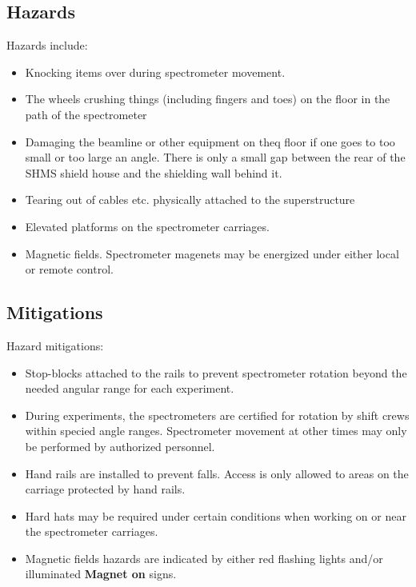 \begin{safetyen}{0}{0}
\subsection{Hazards}

Hazards include:
\begin{itemize}
\item{Knocking items over during spectrometer movement.}
\item{The wheels crushing things (including fingers and toes) on the floor in the path of the
spectrometer}
\item{Damaging the beamline or other equipment on theq floor if one goes to too small
or too large an angle.  There is
only a small gap between the rear of the SHMS shield house and the shielding wall
behind it.}
\item{Tearing out of cables etc. physically attached to the superstructure}
\item{Elevated platforms on the spectrometer carriages.}
\item{Magnetic fields.  Spectrometer magenets may be energized under either
local or remote control.}
\end{itemize}

\subsection{Mitigations}
Hazard mitigations:
\begin{itemize}
	\item{Stop-blocks attached to the rails to prevent spectrometer rotation beyond
	the needed angular range for each experiment.}
	\item{During experiments, the spectrometers are certified for rotation by
	shift crews within specied angle ranges.  Spectrometer movement at other times
	may only be performed by authorized personnel.}
	\item{Hand rails are installed to prevent falls.  Access is only allowed to
	areas on the carriage protected by hand rails.}
	\item{Hard hats may be required under certain conditions when working on or
	near the spectrometer carriages.}
	\item{Magnetic fields hazards are indicated by either red flashing lights and/or
	illuminated \textbf{Magnet on} signs.}
\end{itemize}
\end{safetyen}

